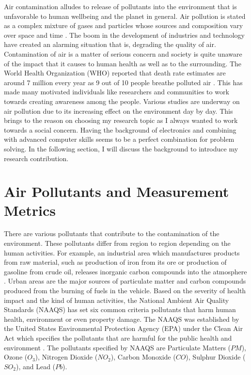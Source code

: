 \par
 Air contamination alludes to release of pollutants into the environment that is unfavorable to human wellbeing and the planet in general. Air pollution is stated as a complex mixture of gases and particles whose sources and composition vary over space and time \cite{HealthEffectsInstitute2017}. The boom in the development of industries and technology have created an alarming situation that is, degrading the quality of air. Contamination of air is a matter of serious concern and society is quite unaware of the impact that it causes to human health as well as to the surrounding. The World Health Organization (WHO) reported that death rate estimates are around 7 million every year as 9 out of 10 people breathe polluted air \cite{who} \cite{WHO2010}. This has made many motivated individuals like researchers and communities to work towards creating awareness among the people. Various studies are underway on air pollution due to its increasing effect on the environment day by day. This brings to the reason on choosing my research topic as I always wanted to work towards a social concern. Having the background of electronics and combining with advanced computer skills seems to be a perfect combination for problem solving. In the following section, I will discuss the background to introduce my research contribution.
 
 
 
 


\section{Air Pollutants and Measurement Metrics}


There are various pollutants that contribute to the contamination of the environment. These pollutants differ from region to region depending on the human activities. For example, an industrial area which manufactures products from raw material, such as production of iron from its ore or production of gasoline from crude oil, releases inorganic carbon compounds into the atmosphere \cite{Vallero2014}. Urban areas are the major sources of particulate matter and carbon compounds produced from the burning of fuels in the vehicle.
Based on the severity of health impact and the kind of human activities, the National Ambient Air Quality Standards (NAAQS) has set six common criteria pollutants that harm human health, environment or even property damage. The NAAQS was established by the United States Environmental Protection Agency (EPA) under the Clean Air Act which specifies the pollutants that are harmful for the public health and environment \cite{USEPA} \cite{NAAQS}. The pollutants specified by NAAQS are Particulate Matters ($PM$), Ozone ($O_3$),  Nitrogen Dioxide ($NO_2$), Carbon Monoxide ($CO$), Sulphur Dioxide ($SO_2$), and Lead ($Pb$).

